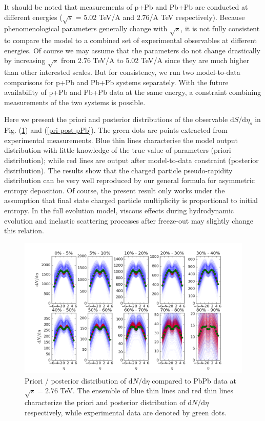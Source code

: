 \documentclass[aps,prl,twocolumn,groupedaddress]{revtex4-1}
\begin{document}
	It should be noted that measurements of p+Pb and Pb+Pb are conducted at different energies ($\sqrt{s}$ = 5.02 TeV/A and 2.76/A TeV respectively). 
	Because phenomenological parameters generally change with $\sqrt{s}$, it is not fully consistent to compare the model to a combined set of experimental observables at different energies.
	Of course we may assume that the parameters do not change drastically by increasing $\sqrt{s}$ from 2.76 TeV/A to 5.02 TeV/A since they are much higher than other interested scales.
	But for consistency, we run two model-to-data comparisons for p+Pb and Pb+Pb systems separately.
	With the future availability of p+Pb and Pb+Pb data at the same energy, a constraint combining measurements of the two systems is possible.
	
	Here we present the priori and posterior distributions of the observable $\mathrm{d}S/\mathrm{d}\eta_s$ in Fig. (\ref{pri-post-PbPb}) and (\ref{pri-post-pPb}).
	The green dots are points extracted from experimental measurements. 
	Blue thin lines characterise the model output distribution with little knowledge of the true value of parameters (priori distribution); while red lines are output after model-to-data constraint (posterior distribution).
	The results show that the charged particle pseudo-rapidity distribution can be very well reproduced by our general formula for asymmetric entropy deposition.
	Of course, the present result only works under the assumption that final state charged particle multiplicity is proportional to initial entropy. 
	In the full evolution model, viscous effects during hydrodynamic evolution and inelastic scattering processes after freeze-out may slightly change this relation.
	
	\begin{figure}
	\begin{center}
	\includegraphics[width=\columnwidth]{pics/pri-post-PbPb.png}
	\caption{Priori / posterior distribution of $\mathrm{d}N/\mathrm{d}\eta$ compared to PbPb data at $\sqrt{s} = 2.76$ TeV. The ensemble of blue thin lines and red thin lines characterize the priori and posterior distribution of $\mathrm{d}N/\mathrm{d}\eta$ respectively, while experimental data are denoted by green dots.}\label{pri-post-PbPb}
	\end{center}
	\end{figure}
	
\end{document}
